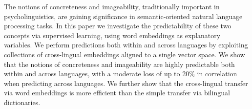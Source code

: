 The notions of concreteness and imageability, traditionally important in psycholinguistics, are gaining significance in semantic-oriented natural language processing tasks. In this paper we investigate the predictability of these two concepts via supervised learning, using word embeddings as explanatory variables. We perform predictions both within and across languages by exploiting collections of cross-lingual embeddings aligned to a single vector space. We show that the notions of concreteness and imageability are highly predictable both within and across languages, with a moderate loss of up to 20\% in correlation when predicting across languages. We further show that the cross-lingual transfer via word embeddings is more efficient than the simple transfer via bilingual dictionaries.

